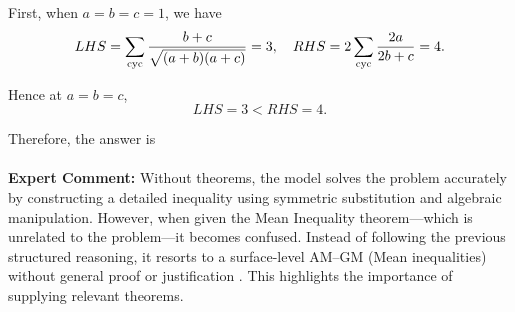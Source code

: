 \begin{examplebox}
First, when \(a=b=c=1\), we have
\[LHS 
= \sum_{\rm cyc}\frac{b+c}{\sqrt{(a+b)(a+c)}}
=3,\quad
RHS 
= 2\sum_{\rm cyc}\frac{2a}{2b+c} =4.
\]

Hence at \(a=b=c\), 
\[
LHS = 3 < RHS = 4.
\]

Therefore, the answer is  
\\\\
\textbf{Expert Comment:}
Without theorems, the model solves the problem accurately by constructing a detailed inequality using symmetric substitution and algebraic manipulation. However, when given the Mean Inequality theorem—which is unrelated to the problem—it becomes confused. Instead of following the previous structured reasoning, it resorts to a surface-level AM–GM (Mean inequalities) without general proof or justification \wronghl. This highlights the importance of supplying relevant theorems.
\end{examplebox}